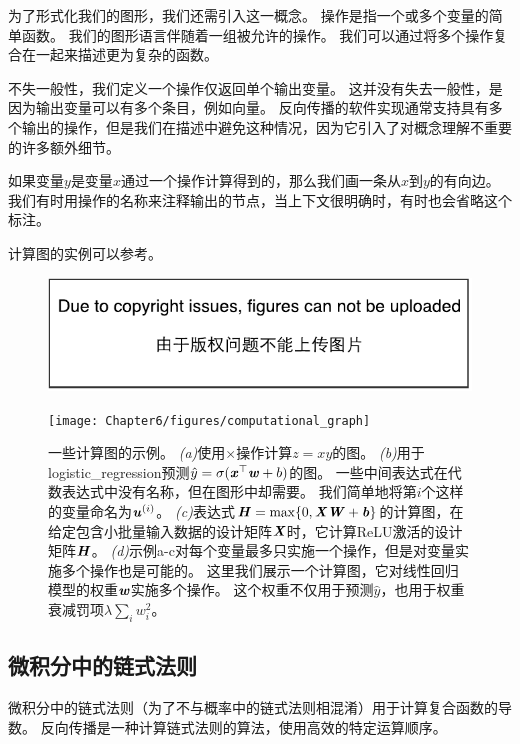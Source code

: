 为了形式化我们的图形，我们还需引入这一概念。
操作是指一个或多个变量的简单函数。
我们的图形语言伴随着一组被允许的操作。
我们可以通过将多个操作复合在一起来描述更为复杂的函数。


不失一般性，我们定义一个操作仅返回单个输出变量。
这并没有失去一般性，是因为输出变量可以有多个条目，例如向量。
反向传播的软件实现通常支持具有多个输出的操作，但是我们在描述中避免这种情况，因为它引入了对概念理解不重要的许多额外细节。

如果变量$y$是变量$x$通过一个操作计算得到的，那么我们画一条从$x$到$y$的有向边。
我们有时用操作的名称来注释输出的节点，当上下文很明确时，有时也会省略这个标注。

计算图的实例可以参考。
\begin{figure}[!htb]
\ifOpenSource
\centerline{\includegraphics{figure.pdf}}
\else
\centerline{\texttt{[image: Chapter6/figures/computational\_graph]}}
\fi
\captionsetup{singlelinecheck=off}
\caption{一些计算图的示例。
\emph{(a)}使用$\times$操作计算$z = xy$的图。 
\emph{(b)}用于\gls{logistic_regression}预测$\hat{y} = \sigma(\boldsymbol{\mathit{x}}^\top \boldsymbol{\mathit{w}} + b)$的图。 一些中间表达式在代数表达式中没有名称，但在图形中却需要。
我们简单地将第$i$个这样的变量命名为$\boldsymbol{\mathit{u}}^{(i)}$。
\emph{(c)}表达式$\boldsymbol{\mathit{H}} = \max \{ 0, \boldsymbol{\mathit{X}}\boldsymbol{\mathit{W}}+ \boldsymbol{\mathit{b}} \}$的计算图，在给定包含小批量输入数据的设计矩阵$\boldsymbol{\mathit{X}}$时，它计算\gls{ReLU}激活的设计矩阵$\boldsymbol{\mathit{H}}$。
\emph{(d)}示例a-c对每个变量最多只实施一个操作，但是对变量实施多个操作也是可能的。 这里我们展示一个计算图，它对线性回归模型的权重$\boldsymbol{\mathit{w}}$实施多个操作。
这个权重不仅用于预测$\hat{y}$，也用于权重衰减罚项$\lambda \sum_i w_i^2$。}
\label{fig:chap6_computational_graph}
\end{figure}

\subsection{微积分中的链式法则}
\label{sec:chain_rule_of_calculus}

微积分中的链式法则（为了不与概率中的链式法则相混淆）用于计算复合函数的导数。
反向传播是一种计算链式法则的算法，使用高效的特定运算顺序。

